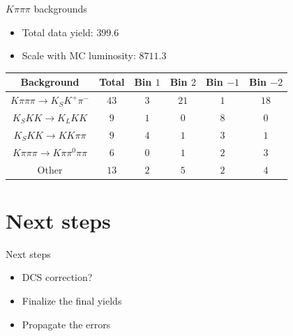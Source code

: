 \documentclass{beamer}
\begin{document}
\begin{frame}{$K\pi\pi\pi$ backgrounds}
  \begin{itemize}
    \item{Total data yield: $399.6$}
    \item{Scale with MC luminosity: $8711.3$}
  \end{itemize}
  \vspace{0.5cm}
  \centering
  \def\arraystretch{1.2}%
  \begin{tabular}{c|ccccc}
    Background                      & Total  & Bin $1$ & Bin $2$ & Bin $-1$ & Bin $-2$ \\
    \hline
    $K\pi\pi\pi\to K_SK^+\pi^-$     & $43$   & $3$     & $21$    & $1$      & $18$ \\
    $K_SKK\to K_LKK$                & $9$    & $1$     & $0$     & $8$      & $0$ \\
    $K_SKK\to KK\pi\pi$             & $9$    & $4$     & $1$     & $3$      & $1$ \\
    $K\pi\pi\pi\to K\pi\pi^0\pi\pi$ & $6$    & $0$     & $1$     & $2$      & $3$ \\
    Other                           & $13$   & $2$     & $5$     & $2$      & $4$ \\
    \hline
  \end{tabular}
  \vspace{0.5cm}
\end{frame}

\section{Next steps}
\begin{frame}{Next steps}
  \begin{itemize}
    \setlength\itemsep{2em}
    \item{DCS correction?}
    \item{Finalize the final yields}
    \item{Propagate the errors}
  \end{itemize}
\end{frame}
\end{document}

